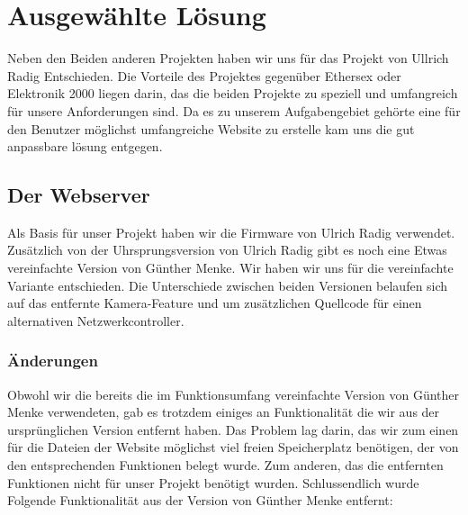 \chapter{Ausgewählte Lösung}

Neben den Beiden anderen Projekten haben wir uns für das Projekt von Ullrich
Radig Entschieden. Die Vorteile des Projektes gegenüber Ethersex oder Elektronik
2000 liegen darin, das die beiden Projekte zu speziell und umfangreich für unsere
Anforderungen sind. Da es zu unserem Aufgabengebiet gehörte eine für den
Benutzer möglichst umfangreiche Website zu erstelle kam uns die gut anpassbare
lösung entgegen.

\section{Der Webserver}

Als Basis für unser Projekt haben wir die Firmware von Ulrich Radig verwendet.
Zusätzlich von der Uhrsprungsversion von Ulrich Radig gibt es noch eine Etwas
vereinfachte Version von Günther Menke. Wir haben wir uns für die vereinfachte
Variante entschieden. Die Unterschiede zwischen beiden
Versionen belaufen sich auf das entfernte Kamera-Feature und um
zusätzlichen Quellcode für einen alternativen Netzwerkcontroller.

\subsection{Änderungen}

Obwohl wir die bereits die im Funktionsumfang vereinfachte Version
von Günther Menke verwendeten, gab es trotzdem einiges an Funktionalität die wir
aus der ursprünglichen Version entfernt haben.
Das Problem lag darin, das wir zum einen für die Dateien der Website möglichst
viel freien Speicherplatz benötigen, der von den entsprechenden Funktionen
belegt wurde. Zum anderen, das die entfernten Funktionen nicht für unser
Projekt benötigt wurden. Schlussendlich wurde Folgende Funktionalität aus der Version
von Günther Menke entfernt:


